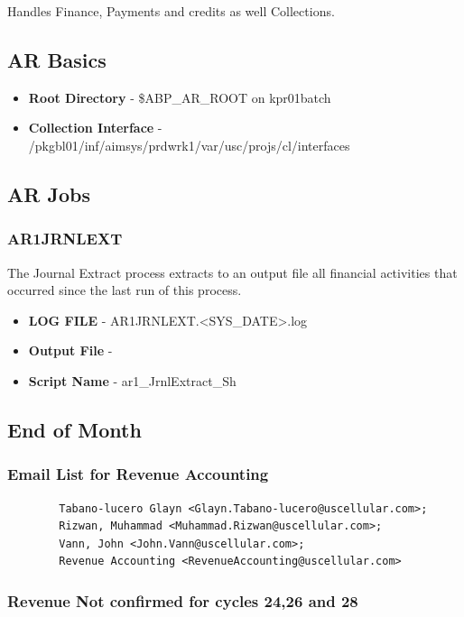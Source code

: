 \documentclass[12pt,twoside]{article}
\begin{document}
  Handles Finance, Payments and credits as well Collections. 
\subsection{AR Basics}
\label{sec-11-1}

\begin{itemize}
\item \textbf{Root Directory} - \$ABP\_AR\_ROOT on kpr01batch
\item \textbf{Collection Interface} - /pkgbl01/inf/aimsys/prdwrk1/var/usc/projs/cl/interfaces
\end{itemize}
\subsection{AR Jobs}
\label{sec-11-2}
\subsubsection{AR1JRNLEXT}
\label{sec-11-2-1}

    The Journal Extract process extracts to an output file all financial activities that occurred since the last run of this process.
\begin{itemize}
\item \textbf{LOG FILE} - AR1JRNLEXT.<SYS\_DATE>.log
\item \textbf{Output File} -
\item \textbf{Script Name} - ar1\_JrnlExtract\_Sh
\end{itemize}
\subsection{End of Month}
\label{sec-11-3}
\subsubsection{Email List for Revenue Accounting}
\label{sec-11-3-1}

\begin{verbatim}
        Tabano-lucero Glayn <Glayn.Tabano-lucero@uscellular.com>; 
        Rizwan, Muhammad <Muhammad.Rizwan@uscellular.com>; 
        Vann, John <John.Vann@uscellular.com>;
        Revenue Accounting <RevenueAccounting@uscellular.com>
\end{verbatim}
\subsubsection{Revenue Not confirmed for cycles 24,26 and 28}
\label{sec-11-3-2}
\end{document}
